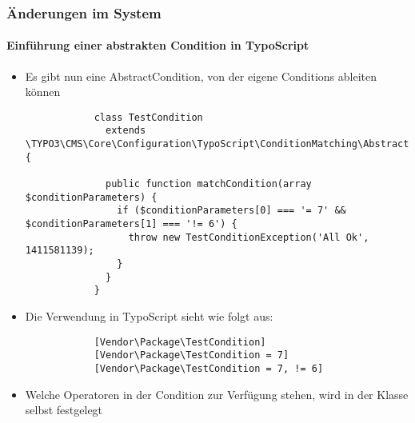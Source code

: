 \begin{frame}[fragile]
	\frametitle{Änderungen im System}
	\framesubtitle{Einführung einer abstrakten Condition in TypoScript}

	\lstset{
		basicstyle=\tiny\ttfamily
	}

	\begin{itemize}
		\item Es gibt nun eine AbstractCondition, von der eigene Conditions ableiten können

		\begin{lstlisting}
			class TestCondition
			  extends \TYPO3\CMS\Core\Configuration\TypoScript\ConditionMatching\AbstractCondition {

			  public function matchCondition(array $conditionParameters) {
 			    if ($conditionParameters[0] === '= 7' && $conditionParameters[1] === '!= 6') {
			      throw new TestConditionException('All Ok', 1411581139);
			    }
			  }
			}
		\end{lstlisting}

		\item Die Verwendung in TypoScript sieht wie folgt aus:

		\begin{lstlisting}
			[Vendor\Package\TestCondition]
			[Vendor\Package\TestCondition = 7]
			[Vendor\Package\TestCondition = 7, != 6]
		\end{lstlisting}

		\item Welche Operatoren in der Condition zur Verfügung stehen, wird in der Klasse selbst festgelegt

	\end{itemize}

\end{frame}



